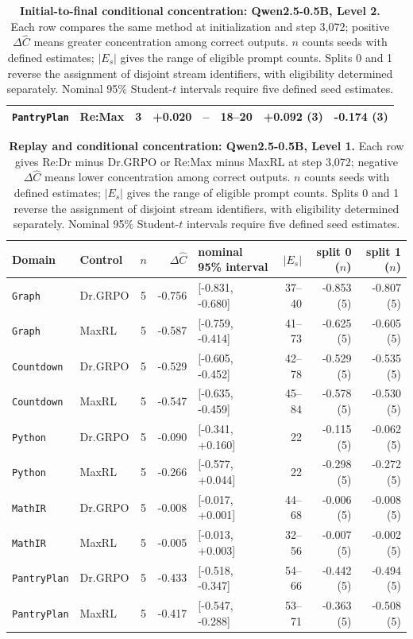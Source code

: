 \begin{table}[!htbp]
\begin{tabular}{@{}llcrlrrr@{}}
\texttt{PantryPlan} & Re:Max & 3 & +0.020 & -- & 18--20 & +0.092 (3) & -0.174 (3) \\
\bottomrule
\end{tabular}
\caption{\textbf{Initial-to-final conditional concentration: Qwen2.5-0.5B, Level 2.} Each row compares the same method at initialization and step 3,072; positive $\Delta\widehat C$ means greater concentration among correct outputs. $n$ counts seeds with defined estimates; $|E_s|$ gives the range of eligible prompt counts. Splits 0 and 1 reverse the assignment of disjoint stream identifiers, with eligibility determined separately. Nominal 95\% Student-$t$ intervals require five defined seed estimates.}
\end{table}

\begin{table}[!htbp]
\centering
\scriptsize
\setlength{\tabcolsep}{3pt}
\begin{tabular}{@{}llcrlrrr@{}}
\toprule
Domain & Control & $n$ & $\Delta\widehat C$ & nominal 95\% interval & $|E_s|$ & split 0 ($n$) & split 1 ($n$) \\
\midrule
\texttt{Graph} & Dr.GRPO & 5 & -0.756 & [-0.831, -0.680] & 37--40 & -0.853 (5) & -0.807 (5) \\
\texttt{Graph} & MaxRL & 5 & -0.587 & [-0.759, -0.414] & 41--73 & -0.625 (5) & -0.605 (5) \\
\texttt{Countdown} & Dr.GRPO & 5 & -0.529 & [-0.605, -0.452] & 42--78 & -0.529 (5) & -0.535 (5) \\
\texttt{Countdown} & MaxRL & 5 & -0.547 & [-0.635, -0.459] & 45--84 & -0.578 (5) & -0.530 (5) \\
\texttt{Python} & Dr.GRPO & 5 & -0.090 & [-0.341, +0.160] & 22 & -0.115 (5) & -0.062 (5) \\
\texttt{Python} & MaxRL & 5 & -0.266 & [-0.577, +0.044] & 22 & -0.298 (5) & -0.272 (5) \\
\texttt{MathIR} & Dr.GRPO & 5 & -0.008 & [-0.017, +0.001] & 44--68 & -0.006 (5) & -0.008 (5) \\
\texttt{MathIR} & MaxRL & 5 & -0.005 & [-0.013, +0.003] & 32--56 & -0.007 (5) & -0.002 (5) \\
\texttt{PantryPlan} & Dr.GRPO & 5 & -0.433 & [-0.518, -0.347] & 54--66 & -0.442 (5) & -0.494 (5) \\
\texttt{PantryPlan} & MaxRL & 5 & -0.417 & [-0.547, -0.288] & 53--71 & -0.363 (5) & -0.508 (5) \\
\bottomrule
\end{tabular}
\caption{\textbf{Replay and conditional concentration: Qwen2.5-0.5B, Level 1.} Each row gives Re:Dr minus Dr.GRPO or Re:Max minus MaxRL at step 3,072; negative $\Delta\widehat C$ means lower concentration among correct outputs. $n$ counts seeds with defined estimates; $|E_s|$ gives the range of eligible prompt counts. Splits 0 and 1 reverse the assignment of disjoint stream identifiers, with eligibility determined separately. Nominal 95\% Student-$t$ intervals require five defined seed estimates.}
\end{table}

